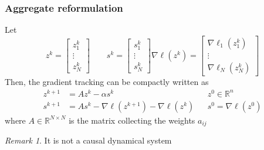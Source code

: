 \documentclass{book}
\newcommand{\R}{\mathbb{R}}
\theoremstyle{theoremv2}
\theoremstyle{defv2}
\theoremstyle{remark}
\newtheorem*{remark}{Remark}
\theoremstyle{remark}
\theoremstyle{definition}
\theoremstyle{definition}
\begin{document}
\subsubsection{Aggregate reformulation}
Let 
\[
    z^k = \begin{bmatrix}
        z_1^k \\ \vdots \\ z_N^k
    \end{bmatrix} \qquad s^k = \begin{bmatrix}
        s_1^k \\ \vdots \\ s_N^k
    \end{bmatrix} \nabla\boldsymbol{\ell}(z^k) = \begin{bmatrix}
        \nabla\ell_1(z_1^k) \\ \vdots \\ \nabla\ell_N(z_N^k)
    \end{bmatrix}
\]
Then, the gradient tracking can be compactly written as 
\begin{align*}
    z^{k+1} &= Az^k - \alpha s^k && z^0 \in \R^n \\
    s^{k+1} &= As^k - \nabla\boldsymbol{\ell}(z^{k+1}) - \nabla\boldsymbol{\ell}(z^{k}) && s^0  = \nabla\boldsymbol{\ell}(z^{0})
\end{align*}
where $A\in\R^{N\times N}$ is the matrix collecting the weights $a_{ij}$
\begin{remark}
    It is not a causal dynamical system
\end{remark}
\end{document}

